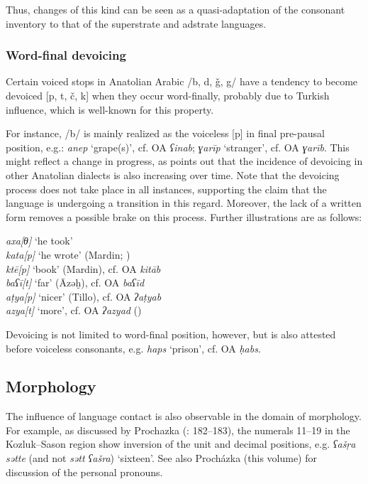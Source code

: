 \documentclass[output=paper]{langsci/langscibook}
\begin{document}
Thus, changes of this kind can be seen as a quasi-adaptation of the consonant inventory to that of the superstrate and adstrate languages.

\subsubsection{Word-final devoicing}

Certain voiced stops in Anatolian Arabic /b, d, ǧ, g/ have a tendency to become devoiced [p, t, č, k] when they occur word-finally, probably due to Turkish influence, which is well-known for this property.

For instance, /b/ is mainly realized as the voiceless [p] in final pre-pausal position, e.g.: \textit{anep} `grape(s)',
cf. OA \textit{ʕinab}; \textit{ɣarīp} `stranger', cf. OA \textit{ɣarīb}. This might reflect a change in progress, as \cite{Lahdo2009} points out that the incidence of devoicing in other Anatolian dialects is also increasing over time. Note that the devoicing process does not take place in all instances, supporting the claim that the language is
undergoing a transition in this regard. Moreover, the lack of a written form removes a possible brake on this process. Further illustrations are as follows:

\ea
\noindent \textit{axa[θ]} `he took’\\
\textit{kata[p]} `he wrote’ (Mardin; \citealt[90]{Jastrow2011anatolian})\\
\textit{kt\={e}[p]} `book' (Mardin), cf. OA \textit{kit\={a}b}\\
\textit{baʕī[t]} `far' (\={A}zəḫ), cf. OA \textit{baʕ\={i}d}\\
\textit{a\d{t}ya[p]} `nicer' (Tillo), cf. OA \textit{ʔa\d{t}yab} \\
\textit{azya[t]} `more', cf. OA \textit{ʔazyad} (\citealt[106]{Lahdo2009})\\
\z

\noindent Devoicing is not limited to word-final position, however, but is also attested before voiceless consonants, e.g. \textit{haps} `prison', cf. OA \textit{ḥabs}. %

\subsection{Morphology}
The influence of language contact is also observable in the domain of morphology.  For example, as discussed by Prochazka (\citeyear{Procházka2018Anatolian}: 182--183),  the numerals 11--19  in the Kozluk--Sason region show inversion of the unit and decimal positions, e.g. \textit{ʕašṛa sətte} (and not \textit{sətt ʕašra}) `sixteen'. See also Procházka (this volume) for discussion of the personal pronouns.
\end{document}
